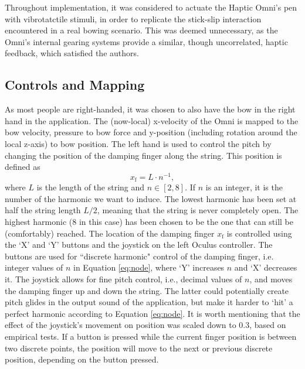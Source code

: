 \documentclass[dvipsnames, pdftex]{article}
\begin{document}
Throughout implementation, it was considered to actuate the Haptic Omni's pen with vibrotatctile stimuli, in order to replicate the stick-slip interaction encountered in a real bowing scenario. This was deemed unnecessary, as the Omni's internal gearing systems provide a similar, though uncorrelated, haptic feedback, which satisfied the authors.  

\subsection{Controls and Mapping}\label{sec:controls}
As most people are right-handed, it was chosen to also have the bow in the right hand in the application. The (now-local) x-velocity of the Omni is mapped to the bow velocity, pressure to bow force and y-position (including rotation around the local z-axis) to bow position. The left hand is used to control the pitch by changing the position of the damping finger along the string. This position is defined as  
\begin{equation}\label{eq:node}
    x_\text{f} = L\cdot n^{-1},
\end{equation}
where $L$ is the length of the string and $n \in [2,8]$. If $n$ is an integer, it is the number of the harmonic we want to induce. The lowest harmonic has been set at half the string length $L/2$, meaning that the string is never completely open. The highest harmonic (8 in this case) has been chosen to be the one that can still be (comfortably) reached. The location of the damping finger $x_\text{f}$ is controlled using the `X' and `Y' buttons and the joystick on the left Oculus controller. %
The buttons are used for ``discrete harmonic" control of the damping finger, i.e. integer values of $n$ in Equation \eqref{eq:node}, where `Y' increases $n$ and `X' decreases it. The joystick allows for fine pitch control, i.e., decimal values of $n$, and moves the damping finger up and down the string. The latter could potentially create pitch glides in the output sound of the application, but make it harder to `hit' a perfect harmonic according to Equation \eqref{eq:node}. It is worth mentioning that the effect of the joystick's movement on position was scaled down to 0.3, based on empirical tests.  If a button is pressed while the current finger position is between two discrete points, the position will move to the next or previous discrete position, depending on the button pressed.
\end{document}
